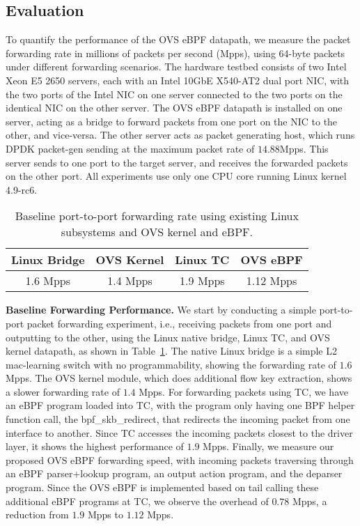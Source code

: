 \documentclass[10pt,numbers,reprint]{sigplanconf}
\begin{document}
\subsection{Evaluation}\label{evaluation}
To quantify the performance of the OVS eBPF datapath, we measure the packet
forwarding rate in millions of packets per second (Mpps), using 64-byte
packets under different forwarding scenarios. The hardware testbed
consists of two Intel Xeon E5 2650 servers, each with an Intel 10GbE
X540-AT2 dual port NIC, with the two ports of the Intel NIC on one server
connected to the two ports on the identical NIC on the other server. The
OVS eBPF datapath is installed on one server, acting as a bridge to
forward packets from one port on the NIC to the other, and vice-versa.
The other server acts as packet generating host, which runs DPDK
packet-gen sending at the maximum packet rate of
$14.88$Mpps. This server sends to one port to the target server, and
receives the forwarded packets on the other port. All experiments use
only one CPU core running Linux kernel 4.9-rc6.
\begin{table}
\centering
\small
\begin{tabular}{|c | c | c| c|}
\hline
 {\bf Linux Bridge} & {\bf OVS Kernel } & {\bf Linux TC} & {\bf OVS eBPF}\\ \hline
 1.6 Mpps & 1.4 Mpps & 1.9 Mpps & 1.12 Mpps\\ \hline
\end{tabular}
\caption{\footnotesize
Baseline port-to-port forwarding rate using existing Linux subsystems and
OVS kernel and eBPF.
}
\label{table:baseperf}
\end{table}

\textbf{Baseline Forwarding Performance.}
We start by conducting a simple port-to-port packet forwarding experiment,
i.e., receiving packets from one port and outputting to the other,
using the Linux native bridge, Linux TC, and OVS kernel datapath, as shown in
Table~\ref{table:baseperf}.
The native Linux bridge is a simple L2 mac-learning switch with no
programmability, showing the forwarding rate of $1.6$ Mpps.
The OVS kernel module, which does additional flow key extraction,
shows a slower forwarding rate of $1.4$ Mpps.
For forwarding packets using TC, we have an eBPF program loaded
into TC, with the program only having one BPF helper function call, the
bpf\_skb\_redirect, that redirects the incoming packet from one interface
to another.  Since TC accesses the incoming packets closest to the driver
layer, it shows the highest performance of $1.9$ Mpps.
Finally, we measure our proposed OVS eBPF forwarding speed,
with incoming packets traversing through an eBPF parser+lookup program,
an output action program, and the deparser program.
Since the OVS eBPF is implemented based on tail calling these
additional eBPF programs at TC, we observe the overhead of $0.78$ Mpps,
a reduction from $1.9$ Mpps to $1.12$ Mpps.
\end{document}
